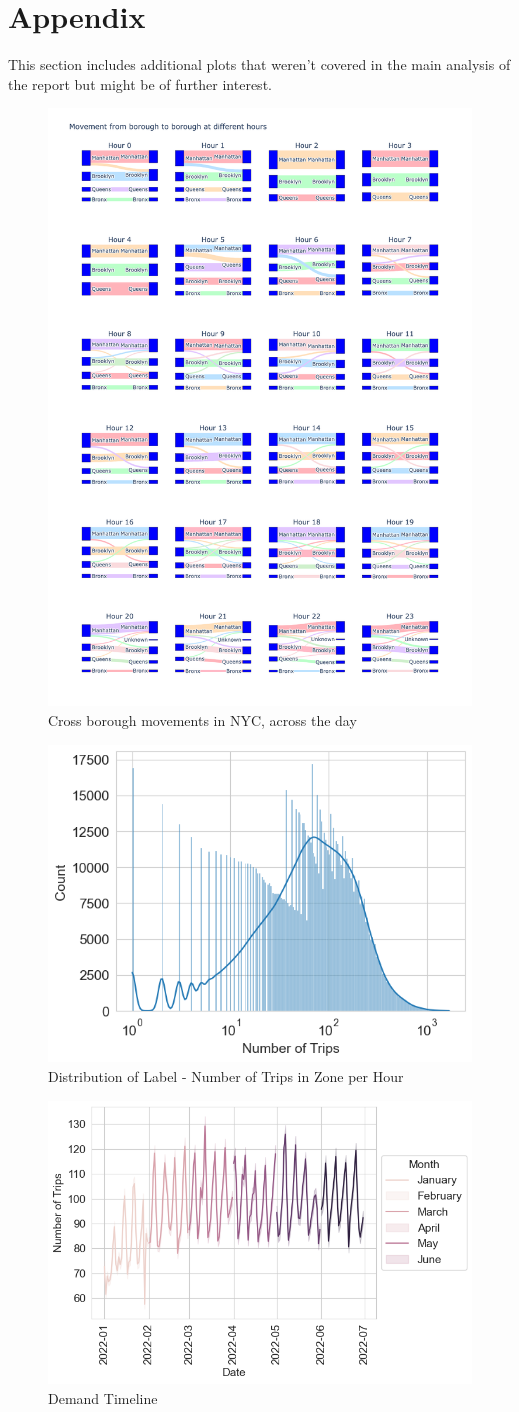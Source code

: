 \documentclass[11pt]{article}
\begin{document}
\section*{Appendix}
This section includes additional plots that weren't covered in the main analysis of the report but might be of further interest.
\begin{figure}[H]
    \centering
    \includegraphics[width=0.7\linewidth]{plots/movement_plot.png}
    \caption{Cross borough movements in NYC, across the day}
\end{figure}
\begin{figure}[H]
    \centering
    \includegraphics[width=0.7\linewidth]{plots/num_trips_distribution.png}
    \caption{Distribution of Label - Number of Trips in Zone per Hour}
\end{figure}
\begin{figure}[H]
    \centering
    \includegraphics[width=0.7\linewidth]{plots/num_trips_monthly.png}
    \caption{Demand Timeline}
\end{figure}
\end{document}
